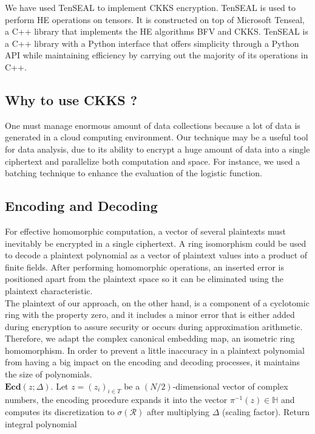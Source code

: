\documentclass{article}
\begin{document}
\noindent We have used TenSEAL to implement CKKS encryption. TenSEAL is used to perform HE operations on tensors. It is constructed on top of Microsoft Tenseal, a C++ library that implements the HE algorithms BFV and CKKS. TenSEAL is a C++ library with a Python interface that offers simplicity through a Python API while maintaining efficiency by carrying out the majority of its operations in C++.



\subsection{Why to use CKKS ?}

\noindent One must manage enormous amount of data collections because a lot of data is generated in a cloud computing environment. Our technique may be a useful tool for data analysis, due to its ability to encrypt a huge amount of data into a single ciphertext and parallelize both computation and space. For instance, we used a batching technique to enhance the evaluation of the logistic function.


\subsection{Encoding and Decoding}

\noindent For effective homomorphic computation, a vector of several plaintexts must inevitably be encrypted in a single ciphertext. A ring isomorphism could be used to decode a plaintext polynomial as a vector of plaintext values into a product of finite fields. After performing homomorphic operations, an inserted error is positioned apart from the plaintext space so it can be eliminated using the plaintext characteristic.     \\

\noindent The plaintext of our approach, on the other hand, is a component of a cyclotomic ring with the property zero, and it includes a minor error that is either added during encryption to assure security or occurs during approximation arithmetic. Therefore, we adapt the complex canonical embedding map, an isometric ring homomorphism. In order to prevent a little inaccuracy in a plaintext polynomial from having a big impact on the encoding and decoding processes, it maintains the size of polynomials.
\\

\noindent $\textbf{Ecd}(z ; \Delta)$. Let $z=\left(z_i\right)_{i\in T}$ be a $(N/2)$-dimensional vector of complex numbers, the encoding procedure expands it into the vector $\pi^{-1}(z) \in \mathbb{H}$ and computes its discretization to $\sigma(\mathcal{R})$ after multiplying $\Delta$ (scaling factor). Return integral polynomial
\end{document}
